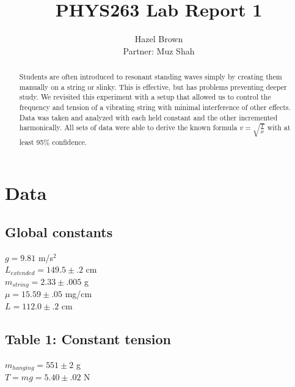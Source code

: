 \documentclass{article}
\title{PHYS263 Lab Report 1}
\author{Hazel Brown\\[1ex]
\small{Partner: Muz Shah}}
\begin{document}
\maketitle

\begin{abstract}
Students are often introduced to resonant standing waves simply by creating them manually on a string or slinky. This is effective, but has problems preventing deeper study. We revisited this experiment with a setup that allowed us to control the frequency and tension of a vibrating string with minimal interference of other effects. Data was taken and analyzed with each held constant and the other incremented harmonically. All sets of data were able to derive the known formula $v=\sqrt{\frac{T}{\mu}}$ with at least 95\% confidence.
\end{abstract}



\section{Data}

\subsection{Global constants}

$g = 9.81$ m/s$^2$ \\
$L_{extended} = 149.5 \pm .2$ cm \\
$m_{string} = 2.33 \pm .005$ g \\
$\mu = 15.59 \pm .05$ mg/cm \\
$L = 112.0 \pm .2$ cm

\subsection{Table 1: Constant tension}

$m_{hanging} = 551 \pm 2$ g \\
$T = mg = 5.40 \pm .02$ N
\end{document}
